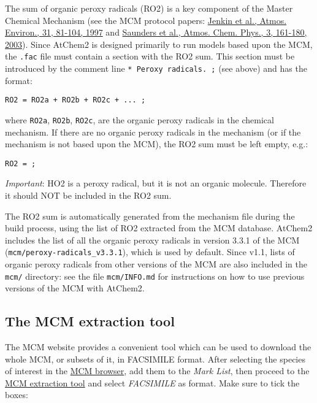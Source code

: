 The sum of organic peroxy radicals (RO2) is a key component of the
Master Chemical Mechanism (see the MCM protocol papers:
\href{https://doi.org/10.1016/S1352-2310(96)00105-7}{Jenkin et al.,
Atmos. Environ., 31, 81-104, 1997} and
\href{https://doi.org/10.5194/acp-3-161-2003}{Saunders et al., Atmos.
Chem. Phys., 3, 161-180, 2003}). Since AtChem2 is designed primarily to
run models based upon the MCM, the \texttt{.fac} file must contain a
section with the RO2 sum. This section must be introduced by the comment
line \texttt{*\ Peroxy\ radicals.\ ;} (see above) and has the format:

\begin{verbatim}
RO2 = RO2a + RO2b + RO2c + ... ;
\end{verbatim}

where \texttt{RO2a}, \texttt{RO2b}, \texttt{RO2c}, are the organic
peroxy radicals in the chemical mechanism. If there are no organic
peroxy radicals in the mechanism (or if the mechanism is not based upon
the MCM), the RO2 sum must be left empty, e.g.:

\begin{verbatim}
RO2 = ;
\end{verbatim}

\emph{Important}: HO2 is a peroxy radical, but it is not an organic
molecule. Therefore it should NOT be included in the RO2 sum.

The RO2 sum is automatically generated from the mechanism file during
the build process, using the list of RO2 extracted from the MCM
database. AtChem2 includes the list of all the organic peroxy radicals
in version 3.3.1 of the MCM (\texttt{mcm/peroxy-radicals\_v3.3.1}),
which is used by default. Since v1.1, lists of organic peroxy radicals
from other versions of the MCM are also included in the \texttt{mcm/}
directory: see the file \texttt{mcm/INFO.md} for instructions on how to
use previous versions of the MCM with AtChem2.

\subsection{The MCM extraction tool} \label{the-mcm-extraction-tool}

The MCM website provides a convenient tool which can be used to download
the whole MCM, or subsets of it, in FACSIMILE format. After selecting
the species of interest in the
\href{http://mcm.leeds.ac.uk/MCMv3.3.1/roots.htt}{MCM browser}, add them
to the \emph{Mark List}, then proceed to the
\href{http://mcm.leeds.ac.uk/MCMv3.3.1/extract.htt}{MCM extraction tool}
and select \emph{FACSIMILE} as format. Make sure to tick the boxes:

